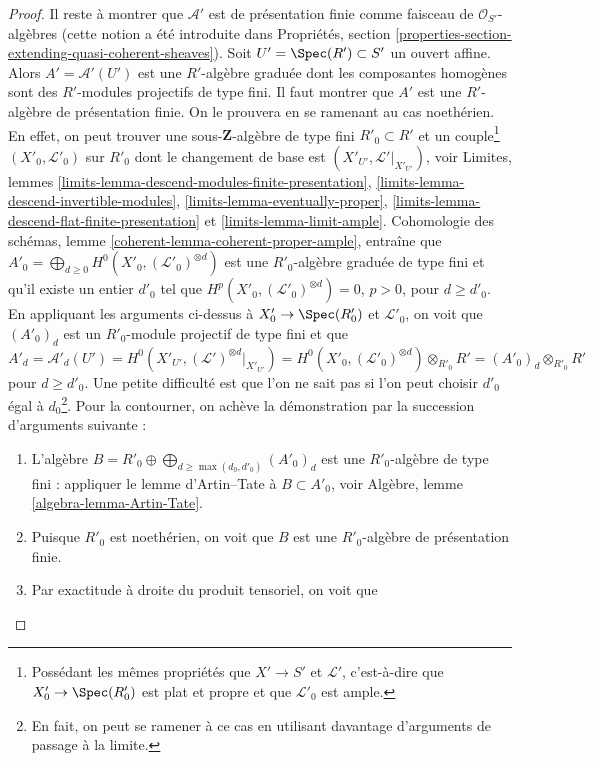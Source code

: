 \begin{proof}
\medskip\noindent
Il reste à montrer que
$\mathcal{A}'$ est de présentation finie comme faisceau de $\mathcal{O}_{S'}$-algèbres
(cette notion a été introduite dans Propriétés, section
\ref{properties-section-extending-quasi-coherent-sheaves}).
Soit $U' = \Spec(R') \subset S'$ un ouvert affine.
Alors $A' = \mathcal{A}'(U')$ est une $R'$-algèbre graduée
dont les composantes homogènes sont des $R'$-modules projectifs de type fini.
Il faut montrer que $A'$ est une $R'$-algèbre de présentation finie.
On le prouvera en se ramenant au cas noethérien.
En effet, on peut trouver une sous-$\mathbf{Z}$-algèbre de type fini
$R'_0 \subset R'$ et un couple\footnote{Possédant les mêmes propriétés
que $X' \to S'$ et $\mathcal{L}'$, c'est-à-dire
que $X'_0 \to \Spec(R'_0)$ est plat et propre et que $\mathcal{L}'_0$
est ample.} $(X'_0, \mathcal{L}'_0)$ sur $R'_0$
dont le changement de base est $(X'_{U'}, \mathcal{L}'|_{X'_{U'}})$, voir
Limites, lemmes
\ref{limits-lemma-descend-modules-finite-presentation},
\ref{limits-lemma-descend-invertible-modules},
\ref{limits-lemma-eventually-proper},
\ref{limits-lemma-descend-flat-finite-presentation} et
\ref{limits-lemma-limit-ample}.
Cohomologie des schémas, lemme \ref{coherent-lemma-coherent-proper-ample},
entraîne que
$A'_0 = \bigoplus_{d \geq 0} H^0(X'_0, (\mathcal{L}'_0)^{\otimes d})$
est une $R'_0$-algèbre graduée de type fini et
qu'il existe un entier $d'_0$ tel que
$H^p(X'_0, (\mathcal{L}'_0)^{\otimes d}) = 0$, $p > 0$, pour $d \geq d'_0$.
En appliquant les arguments ci-dessus à $X'_0 \to \Spec(R'_0)$ et
$\mathcal{L}'_0$, on voit que $(A'_0)_d$ est un $R'_0$-module projectif de type fini
et que
$$
A'_d = \mathcal{A}'_d(U') =
H^0(X'_{U'}, (\mathcal{L}')^{\otimes d}|_{X'_{U'}}) =
H^0(X'_0, (\mathcal{L}'_0)^{\otimes d}) \otimes_{R'_0} R' =
(A'_0)_d \otimes_{R'_0} R'
$$
pour $d \geq d'_0$. Une petite difficulté est que l'on ne sait pas
si l'on peut choisir $d'_0$ égal à $d_0$\footnote{En fait,
on peut se ramener à ce cas en utilisant davantage d'arguments de passage à la limite.}. Pour
la contourner, on achève la démonstration par la succession d'arguments
suivante :
\begin{enumerate}
\item[(a)] L'algèbre
$B = R'_0 \oplus \bigoplus_{d \geq \max(d_0, d'_0)} (A'_0)_d$
est une $R'_0$-algèbre de type fini : appliquer
le lemme d'Artin--Tate à $B \subset A'_0$, voir
Algèbre, lemme \ref{algebra-lemma-Artin-Tate}.
\item[(b)] Puisque $R'_0$ est noethérien, on voit que
$B$ est une $R'_0$-algèbre de présentation finie.
\item[(c)] Par exactitude à droite du produit tensoriel, on voit que

\end{enumerate}
\end{proof}
